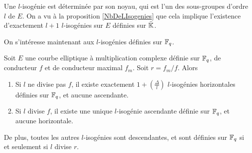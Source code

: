 \begin{Rem}
	Une $l$-isogénie est déterminée par son noyau, qui est l'un des sous-groupes d'ordre $l$ de $E$. On a vu à la proposition \ref{NbDeLIsogenies} que cela implique l'existence d'exactement $l+1$ $l$-isogénies sur $E$ définies sur $\bar{\mathbb{K}}$. 
\end{Rem}

On s'intéresse maintenant aux $l$-isogénies définies sur $\mathbb{F}_{q}$.

\begin{Prop}\label{KohelStructureVolcan}
	
	Soit $E$ une courbe elliptique à multiplication complexe définie sur $\mathbb{F}_{q}$, de conducteur $f$ et de conducteur maximal $f_{m}$. Soit
	$r = f_{m}/f$. Alors
	\begin{enumerate}
		\item Si $l$ ne divise pas $f$, il existe exactement $1 + \left( \frac{\Delta}{l}\right)$ $l$-isogénies horizontales définies sur $\mathbb{F}_{q}$, et aucune ascendante.
		\item Si $l$ divise $f$, il existe une unique $l$-isogénie ascendante définie sur $\mathbb{F}_{q}$, et aucune horizontale.
	\end{enumerate}
	De plus, toutes les autres $l$-isogénies sont descendantes, et sont définies sur $\mathbb{F}_{q}$ si et seulement si $l$ divise $r$. 
\end{Prop}

